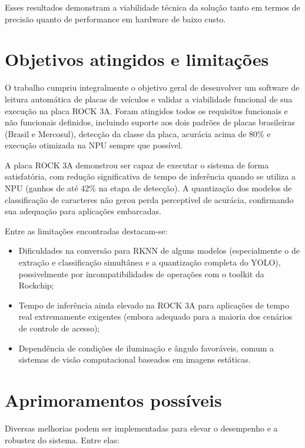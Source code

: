 Esses resultados demonstram a viabilidade técnica da solução tanto em termos de precisão quanto de performance em hardware de baixo custo.

\section{Objetivos atingidos e limitações}

O trabalho cumpriu integralmente o objetivo geral de desenvolver um software de leitura automática de placas de veículos e validar a viabilidade funcional de sua execução na placa ROCK 3A. Foram atingidos todos os requisitos funcionais e não funcionais definidos, incluindo suporte aos dois padrões de placas brasileiras (Brasil e Mercosul), detecção da classe da placa, acurácia acima de 80\% e execução otimizada na NPU sempre que possível.

A placa ROCK 3A demonstrou ser capaz de executar o sistema de forma satisfatória, com redução significativa de tempo de inferência quando se utiliza a NPU (ganhos de até 42\% na etapa de detecção). A quantização dos modelos de classificação de caracteres não gerou perda perceptível de acurácia, confirmando sua adequação para aplicações embarcadas.

Entre as limitações encontradas destacam-se:

\begin{itemize}
    \item Dificuldades na conversão para RKNN de alguns modelos (especialmente o de extração e classificação simultânea e a quantização completa do YOLO), possivelmente por incompatibilidades de operações com o toolkit da Rockchip;
    \item Tempo de inferência ainda elevado na ROCK 3A para aplicações de tempo real extremamente exigentes (embora adequado para a maioria dos cenários de controle de acesso);
    \item Dependência de condições de iluminação e ângulo favoráveis, comum a sistemas de visão computacional baseados em imagens estáticas.
\end{itemize}

\section{Aprimoramentos possíveis}

Diversas melhorias podem ser implementadas para elevar o desempenho e a robustez do sistema. Entre elas:

